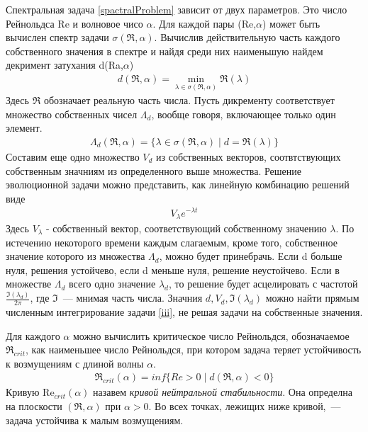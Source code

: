 Спектральная задача \ref{spactralProblem} зависит от двух параметров. Это число Рейнольдса Re и волновое чисо $\alpha$. Для каждой пары (Re,$\alpha$) может быть вычислен спектр задачи $\sigma(\Re,\alpha)$. Вычислив действительную часть каждого собственного значения в спектре и найдя среди них наименьшую найдем декримент затухания d(Ra,$\alpha$)
\begin{gather}
 d(\Re,\alpha) = \min_{\lambda \in \sigma(\Re,\alpha)} \mathfrak{R}(\lambda)
\end{gather}
Здесь $\mathfrak{R}$ обозначает реальную часть числа. Пусть дикременту соответствует множество собственных чисел $\Lambda_d$, вообще говоря, включающее только один элемент.
\begin{gather}
 \Lambda_d(\Re,\alpha) = \{ \lambda \in \sigma(\Re,\alpha) \mid d = \mathfrak{R}(\lambda) \}
\end{gather}
Составим еще одно множество $V_d$ из собственных векторов, соотвтствующих собственным значниям из определенного выше множества. Решение эволюционной задачи можно представить, как линейную комбинацию решений виде 
\begin{gather}
 V_\lambda e^{-\lambda t}
\end{gather}
Здесь $V_\lambda$ - собственный вектор, соответствующий собственному значению $\lambda$. 
По истечению некоторого времени каждым слагаемым, кроме того, собственное значение которого из
множества $\Lambda_d$, можно будет принебрачь. Если d больше нуля, решения устойчево, если d 
меньше нуля, решение неустойчево. Если в множестве $\Lambda_d$ всего одно значение $\lambda_d$, то 
решение будет асцелировать с частотой $\frac{\mathfrak{I}(\lambda_d)}{2\pi}$, где 
$\mathfrak{I}$~--- мнимая часть числа. Значния $d, V_d, \mathfrak{I}(\lambda_d)$ можно найти 
прямым численным интегрирование задачи \ref{iii}, не решая задачи на собственные значения.



Для каждого $\alpha$ можно вычислить критическое число Рейнольдся, обозначаемое $\Re_{crit}$, как наименьшее число Рейнольдся, при котором задача теряет устойчивость к возмущениям с длиной волны $\alpha$.
\begin{gather}
 \Re_{crit}(\alpha) = inf\{Re>0 \mid d(\Re,\alpha) < 0\}
\end{gather}
Кривую Re$_{crit}(\alpha)$ назавем \textit{кривой нейтральной стабильности}. Она определна на плоскости $(\Re,\alpha)$ при $\alpha > 0$. Во всех точках, лежищих ниже кривой,~--- задача устойчива к малым возмущениям. 

